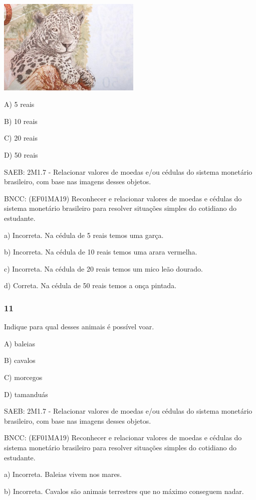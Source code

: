 \includegraphics[width=2.68408in,height=1.78802in]{media/image157.jpg}

A) 5 reais

B) 10 reais

C) 20 reais

D) 50 reais

SAEB: 2M1.7 - Relacionar valores de moedas e/ou cédulas do sistema
monetário brasileiro, com base nas imagens desses objetos.

BNCC: (EF01MA19) Reconhecer e relacionar valores de moedas e cédulas do
sistema monetário brasileiro para resolver situações simples do
cotidiano do estudante.

a) Incorreta. Na cédula de 5 reais temos uma garça.

b) Incorreta. Na cédula de 10 reais temos uma arara vermelha.

c) Incorreta. Na cédula de 20 reais temos um mico leão dourado.

d) Correta. Na cédula de 50 reais temos a onça pintada.

\subsubsection{11 }\label{section-142}

Indique para qual desses animais é possível voar.

A) baleias

B) cavalos

C) morcegos

D) tamanduás

SAEB: 2M1.7 - Relacionar valores de moedas e/ou cédulas do sistema
monetário brasileiro, com base nas imagens desses objetos.

BNCC: (EF01MA19) Reconhecer e relacionar valores de moedas e cédulas do
sistema monetário brasileiro para resolver situações simples do
cotidiano do estudante.

a) Incorreta. Baleias vivem nos mares.

b) Incorreta. Cavalos são animais terrestres que no máximo conseguem
nadar.

